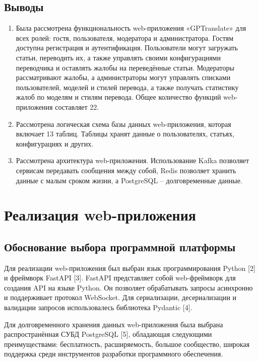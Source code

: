 \documentclass[14pt]{extarticle}
\begin{document}
\subsection{Выводы}

\begin{enumerate}
    \item Была рассмотрена функциональность web-приложения «GPTranslate» для всех ролей: гостя, пользователя, модератора и администратора. Гостям доступна регистрация и аутентификация. Пользователи могут загружать статьи, переводить их, а также управлять своими конфигурациями переводчика и оставлять жалобы на переведённые статьи. Модераторы рассматривают жалобы, а администраторы могут управлять списками пользователей, моделей и стилей перевода, а также получать статистику жалоб по моделям и стилям перевода. Общее количество функций web-приложения составляет 22.
    \item Рассмотрена логическая схема базы данных web-приложения, которая включает 13 таблиц. Таблицы хранят данные о пользователях, статьях, конфигурациях и других.
    \item Рассмотрена архитектура web-приложения. Использование Kafka позволяет сервисам передавать сообщения между собой, Redis позволяет хранить данные с малым сроком жизни, а PostgreSQL – долговременные данные.
\end{enumerate}

\clearpage
\section{Реализация web-приложения}
\subsection{Обоснование выбора программной платформы}

Для реализации web-приложения был выбран язык программирования Python [2] и фреймворк FastAPI [3]. FastAPI представляет собой web-фреймворк для создания API на языке Python. Он позволяет обрабатывать запросы асинхронно и поддерживает протокол WebSocket. Для сериализации, десериализации и валидации запросов использовалесь библиотека Pydantic [4].

Для долговременного хранения данных web-приложения была выбрана распространённая СУБД PostgreSQL [5], обладающая следующими преимуществами: бесплатность, расширяемость, большое сообщество, широкая поддержка среди инструментов разработки программного обеспечения.
\end{document}
